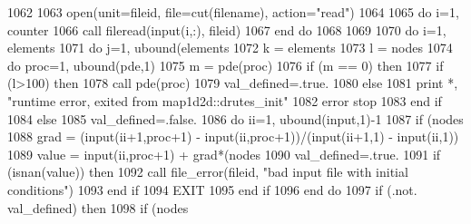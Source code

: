 \begin{DoxyCode}
1062       
1063       \textcolor{keyword}{open}(unit=fileid, file=cut(filename), action=\textcolor{stringliteral}{"read"})
1064       
1065       \textcolor{keywordflow}{do} i=1, counter
1066         \textcolor{keyword}{call }fileread(input(i,:), fileid)
1067 \textcolor{keywordflow}{      end do}
1068             
1069 
1070       \textcolor{keywordflow}{do} i=1, elements%
1071         \textcolor{keywordflow}{do} j=1, ubound(elements%
1072           k = elements%
1073           l = nodes%
1074           \textcolor{keywordflow}{do} proc=1, ubound(pde,1)
1075             m = pde(proc)%
1076             \textcolor{keywordflow}{if} (m == 0) \textcolor{keywordflow}{then}
1077               \textcolor{keywordflow}{if} (l>100) \textcolor{keywordflow}{then}
1078                 \textcolor{keyword}{call }pde(proc)%
1079                 val\_defined=.true.
1080               \textcolor{keywordflow}{else}
1081                 print *, \textcolor{stringliteral}{"runtime error, exited from map1d2d::drutes\_init"}
1082                 error stop
1083 \textcolor{keywordflow}{              end if}             
1084             \textcolor{keywordflow}{else}
1085               val\_defined=.false.
1086               \textcolor{keywordflow}{do} ii=1, ubound(input,1)-1
1087                 \textcolor{keywordflow}{if} (nodes%
1088                   grad = (input(ii+1,proc+1) - input(ii,proc+1))/(input(ii\textcolor{comment}{+1,1) - input(ii,1))}
1089 \textcolor{comment}{                  }\textcolor{keywordtype}{value} =  input(ii,proc+1) + grad*(nodes%
1090 \textcolor{comment}{                  val\_defined=.true.}
1091 \textcolor{comment}{                  }\textcolor{keywordflow}{if} (isnan(\textcolor{keywordtype}{value})) \textcolor{keywordflow}{then}
1092                     \textcolor{keyword}{call }file_error(fileid, \textcolor{stringliteral}{"bad input file with initial conditions"}\textcolor{comment}{)}
1093 \textcolor{comment}{}\textcolor{keywordflow}{                  end if}
1094                   \textcolor{keywordflow}{EXIT}
1095 \textcolor{keywordflow}{                end if}
1096 \textcolor{keywordflow}{              end do}
1097               \textcolor{keywordflow}{if} (.not. val\_defined) \textcolor{keywordflow}{then}
1098                 \textcolor{keywordflow}{if} (nodes%

\end{DoxyCode}
